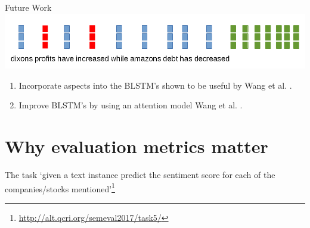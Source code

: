 \documentclass[10pt]{beamer}
\begin{document}
\begin{frame}[fragile]{Future Work}
\includegraphics[scale=0.3]{sentence_attention.png}

\begin{enumerate}
\item Incorporate aspects into the BLSTM's shown to be useful by Wang et al. \cite{wangattention}.
\item Improve BLSTM's by using an attention model Wang et al. \cite{wangattention}.
\end{enumerate}

\end{frame}

\section{Why evaluation metrics matter}

\begin{frame}[fragile]{The task}
`given a text instance predict the sentiment score for each of the companies/stocks mentioned'\footnote{\url{http://alt.qcri.org/semeval2017/task5/}}

\end{frame}
\end{document}
